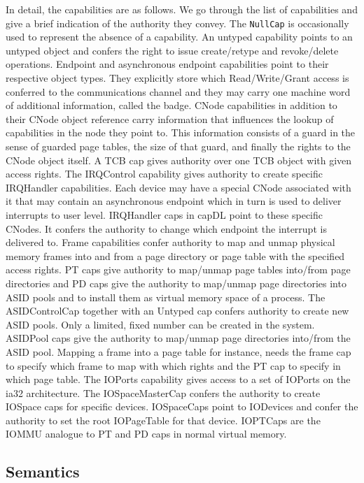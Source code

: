 \documentclass[a4paper,11pt]{article}
\begin{document}
In detail, the capabilities are as follows. We go through the list of 
capabilities and give a brief indication of the authority they convey. The 
\texttt{NullCap} is occasionally used to represent the absence of a capability. 
An untyped capability points to an untyped object and confers the right to 
issue create/retype and revoke/delete operations. Endpoint and asynchronous 
endpoint capabilities point to their respective object types. They explicitly 
store which Read/Write/Grant access is conferred to the communications channel 
and they may carry one machine word of additional information, called the 
badge. CNode capabilities in addition to their CNode object reference carry 
information that influences the lookup of capabilities in the node they point 
to. This information consists of a guard in the sense of guarded page tables, 
the size of that guard, and finally the rights to the CNode object itself. A 
TCB cap gives authority over one TCB object with given access rights. The 
IRQControl capability gives authority to create specific IRQHandler 
capabilities. Each device may have a special CNode associated with it that may 
contain an asynchronous endpoint which in turn is used to deliver interrupts to 
user level. IRQHandler caps in capDL point to these specific CNodes. It confers 
the authority to change which endpoint the interrupt is delivered to. Frame 
capabilities confer authority to map and unmap physical memory frames into and 
from a page directory or page table with the specified access rights. PT caps 
give authority to map/unmap page tables into/from page directories and PD caps 
give the authority to map/unmap page directories into ASID pools and to install 
them as virtual memory space of a process. The ASIDControlCap together with an 
Untyped cap confers authority to create new ASID pools. Only a limited, fixed 
number can be created in the system. ASIDPool caps give the authority to 
map/unmap page directories into/from the ASID pool. Mapping a frame into a page 
table for instance, needs the frame cap to specify which frame to map with 
which rights and the PT cap to specify in which page table. The IOPorts 
capability gives access to a set of IOPorts on the ia32 architecture. The 
IOSpaceMasterCap confers the authority to create IOSpace caps for specific 
devices. IOSpaceCaps point to IODevices and confer the authority to set the 
root IOPageTable for that device. IOPTCaps are the IOMMU analogue to PT and PD 
caps in normal virtual memory.



\subsection{Semantics}
\end{document}
